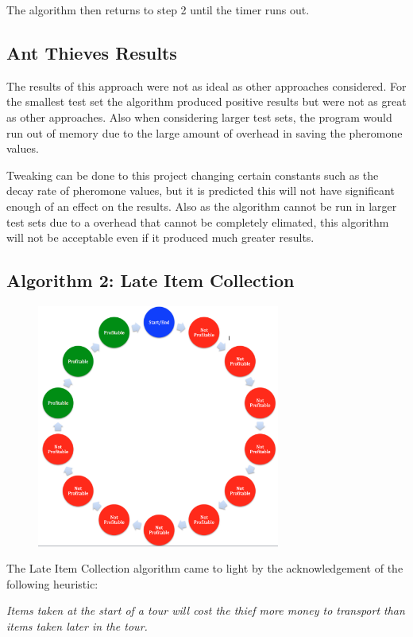 \documentclass[a4paper,12pt]{article}
\begin{document}
The algorithm then returns to step 2 until the timer runs out.

\subsection*{Ant Thieves Results}


The results of this approach were not as ideal as other approaches considered. For the smallest test set the algorithm produced positive results but were not as great as other approaches. Also when considering larger test sets, the program would run out of memory due to the large amount of overhead in saving the pheromone values.

Tweaking can be done to this project changing certain constants such as the decay rate of pheromone values, but it is predicted this will not have significant enough of an effect on the results. Also as the algorithm cannot be run in larger test sets due to a overhead that cannot be completely elimated, this algorithm will not be acceptable even if it produced much greater results.

\newpage



\subsection*{Algorithm 2: Late Item Collection}
\begin{figure}[h]
\centering
\includegraphics[width=80mm]{AlgorithmIdea.png}
\end{figure}
The Late Item Collection algorithm came to light by the acknowledgement of the following heuristic:

\begin{center}
\emph{Items taken at the start of a tour will cost the thief more money to transport than items taken later in the tour.}
\end{center}
\end{document}

